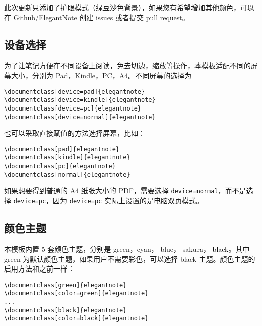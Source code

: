 \documentclass[cn,pad,11pt,green,geye]{../elegantnote}
\begin{document}
\begin{remark}
此次更新只添加了护眼模式（绿豆沙色背景），如果您有希望增加其他颜色，可以在 \href{https://github.com/ElegantLaTeX/ElegantNote}{Github/ElegantNote} 创建 issues 或者提交 pull request。
\end{remark}

\subsection{设备选择}
为了让笔记方便在不同设备上阅读，免去切边，缩放等操作，本模板适配不同的屏幕大小，分别为 Pad，Kindle，PC，A4。不同屏幕的选择为
\begin{lstlisting}[frame=none]  
\documentclass[device=pad]{elegantnote}
\documentclass[device=kindle]{elegantnote}
\documentclass[device=pc]{elegantnote}
\documentclass[device=normal]{elegantnote}
\end{lstlisting}
\begin{note}
也可以采取直接赋值的方法选择屏幕，比如：
\end{note}
\begin{lstlisting}[frame=none]  
\documentclass[pad]{elegantnote}
\documentclass[kindle]{elegantnote}
\documentclass[pc]{elegantnote}
\documentclass[normal]{elegantnote}
\end{lstlisting}

\begin{note}
如果想要得到普通的 A4 纸张大小的 PDF，需要选择 \lstinline{device=normal}，而不是选择 \lstinline{device=pc}，因为  \lstinline{device=pc} 实际上设置的是电脑双页模式。
\end{note}

\subsection{颜色主题}
本模板内置 5 套颜色主题，分别是 \textcolor{egreen}{green}，\textcolor{ecyan}{cyan}， \textcolor{eblue}{blue}， \textcolor{sakura}{sakura}， \textcolor{black}{black}。其中 green 为默认颜色主题，如果用户不需要彩色，可以选择 black 主题。颜色主题的启用方法和之前一样：
\begin{lstlisting}[frame=none]  
\documentclass[green]{elegantnote}
\documentclass[color=green]{elegantnote}
...
\documentclass[black]{elegantnote}
\documentclass[color=black]{elegantnote}
\end{lstlisting}
\end{document}
